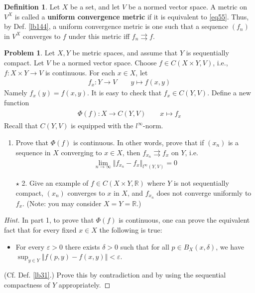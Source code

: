 \documentclass[12pt,b5paper,notitlepage]{article}
\theoremstyle{definition}
\newtheorem{df}{Definition}[section]
\newtheorem{prob}{\color{red}Problem}[section]
\theoremstyle{plain}
\newcommand{\Rbb}{\mathbb R}
\newcommand{\eps}{\varepsilon}
\numberwithin{equation}{section}
\begin{document}
\begin{df}\label{lb146}
Let $X$ be a set, and let $V$ be a normed vector space. A metric on $V^X$ is called a \textbf{uniform convergence metric}  if it is equivalent to \eqref{eq55}. Thus, by Def. \ref{lb144}, a uniform convergence metric is one such that a sequence $(f_n)$ in $V^X$ converges to $f$ under this metric iff $f_n\rightrightarrows f$.
\end{df}




\begin{prob}\label{lb103}
Let $X,Y$ be metric spaces, and assume that $Y$ is sequentially compact. Let $V$ be a normed vector space. Choose $f\in C(X\times Y,V)$, i.e., $f:X\times Y\rightarrow V$ is continuous. For each $x\in X$, let
\begin{align*}
f_x:Y\rightarrow V\qquad y\mapsto f(x,y)
\end{align*}
Namely $f_x(y)=f(x,y)$. It is easy to check that $f_x\in C(Y,V)$. Define a new function
\begin{gather}
\begin{gathered}
\Phi(f):X\rightarrow C(Y,V)\qquad x\mapsto f_x
\end{gathered}
\end{gather}
Recall that $C(Y,V)$ is equipped with the $l^\infty$-norm. 
\begin{enumerate}
\item Prove that $\Phi(f)$ is continuous. In other words, prove that if $(x_n)$ is a sequence in $X$ converging to  $x\in X$, then $f_{x_n}\rightrightarrows f_x$ on $Y$, i.e.
\begin{align*}
\lim_{n\rightarrow\infty}\Vert f_{x_n}-f_x\Vert_{l^\infty(Y,V)}=0
\end{align*}
\item[$\star$ 2.]  Give an example of $f\in C(X\times Y,\Rbb)$ where $Y$ is not sequentially compact, $(x_n)$ converges to $x$ in $X$, and $f_{x_n}$ does not converge uniformly to $f_x$. (Note: you may consider $X=Y=\Rbb$.)
\end{enumerate}

\end{prob}

\begin{proof}[Hint]
In part 1, to prove that $\Phi(f)$ is continuous,   one can  prove the equivalent fact that for every fixed $x\in X$ the following is true:
\begin{itemize}
\item For every $\eps>0$ there exists $\delta>0$ such that for all $p\in B_X(x,\delta)$, we have $\sup_{y\in Y}\Vert f(p,y)-f(x,y)\Vert<\eps$. 
\end{itemize}
(Cf. Def. \ref{lb31}.) Prove this by contradiction and by using the sequential compactness of $Y$ appropriately.
\end{proof}
\end{document}
